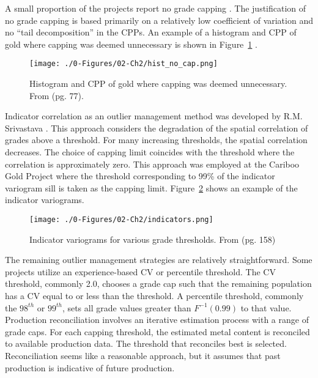 A small proportion of the projects report no grade capping \citep{medgold2021,pasofino2020,eldorado2020}. The justification of no grade capping is based primarily on a relatively low coefficient of variation and no ``tail decomposition'' in the CPPs. An example of a histogram and CPP of gold where capping was deemed unnecessary is shown in Figure~\ref{fig:nocap} \citep{medgold2021}.

\begin{figure}[htb!]
    \centering
    \texttt{[image: ./0-Figures/02-Ch2/hist\_no\_cap.png]}
    \caption{Histogram and CPP of gold where capping was deemed unnecessary. From \cite{medgold2021} (pg. 77).}
    \label{fig:nocap}
\end{figure}

Indicator correlation as an outlier management method was developed by R.M. Srivastava \citep{leuangthong2015dealing}. This approach considers the degradation of the spatial correlation of grades above a threshold. For many increasing thresholds, the spatial correlation decreases. The choice of capping limit coincides with the threshold where the correlation is approximately zero. This approach was employed at the Cariboo Gold Project \citep{osiko2020} where the threshold corresponding to 99\% of the indicator variogram sill is taken as the capping limit. Figure~\ref{fig:indicators} shows an example of the indicator variograms.

\begin{figure}[htb!]
    \centering
    \texttt{[image: ./0-Figures/02-Ch2/indicators.png]}
    \caption{Indicator variograms for various grade thresholds. From \cite{osiko2020} (pg. 158)}
    \label{fig:indicators}
\end{figure}

The remaining outlier management strategies are relatively straightforward. Some projects utilize an experience-based CV or percentile threshold. The CV threshold, commonly 2.0, chooses a grade cap such that the remaining population has a CV equal to or less than the threshold. A percentile threshold, commonly the $98^{th}$ or $99^{th}$, sets all grade values greater than $F^{-1}(0.99)$ to that value. Production reconciliation involves an iterative estimation process with a range of grade caps. For each capping threshold, the estimated metal content is reconciled to available production data. The threshold that reconciles best is selected. Reconciliation seems like a reasonable approach, but it assumes that past production is indicative of future production.

